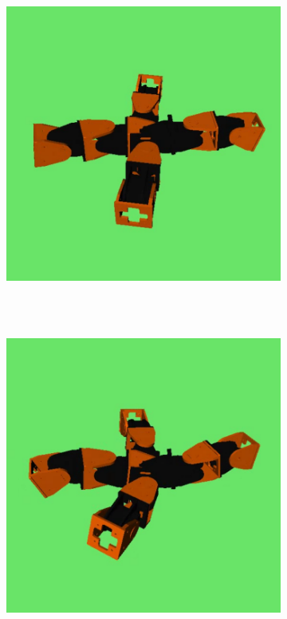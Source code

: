 \begin{figure}[h]
\begin{subfigure}[b]{0.18\textwidth}
                \\~
        \end{subfigure}
        ~
        \begin{subfigure}[b]{0.18\textwidth}
         	   \centering
                \includegraphics[width=\textwidth]{images/results_9_gait_08.png}
                 \\~
        \end{subfigure}
        ~
        \begin{subfigure}[b]{0.18\textwidth}
         	   \centering
                \includegraphics[width=\textwidth]{images/results_9_gait_09.png}

\end{subfigure}
\end{figure}
